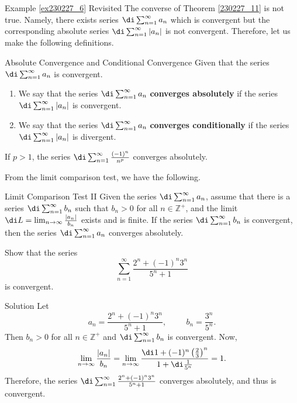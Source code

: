 \begin{example}{\linkt Example \ref{ex230227_6} Revisited}
The converse of Theorem \ref{230227_11} is not true. Namely, there exists series $\di\sum_{n=1}^{\infty}a_n$ which is  convergent but the corresponding absolute series $\di\sum_{n=1}^{\infty}|a_n|$ is not convergent. Therefore, let us make the following definitions.
\begin{definition}{Absolute Convergence and Conditional Convergence}
Given that the series $\di\sum_{n=1}^{\infty}a_n$ is convergent.
\begin{enumerate}[1.]
\item
We say that the series $\di\sum_{n=1}^{\infty}a_n$ {\bf converges absolutely} if the series $\di\sum_{n=1}^{\infty}|a_n|$ is convergent.
\item We say that the series $\di\sum_{n=1}^{\infty}a_n$ {\bf converges conditionally} if the series $\di\sum_{n=1}^{\infty}|a_n|$ is divergent.
\end{enumerate}
\end{definition}

 

\begin{example}{}
If $p>1$, the series $\di\sum_{n=1}^{\infty}\frac{(-1)^n}{n^p}$ converges absolutely.
\end{example}

From the limit comparison test, we have the following. 
\begin{theorem}{Limit Comparison Test II}
Given the  series  $\di\sum_{n=1}^{\infty}a_n$, assume that there is a series $\di\sum_{n=1}^{\infty}b_n$ such that $b_n>0$ for all $n\in\mathbb{Z}^+$, and the limit $\di L=\lim_{n\to\infty} \frac{|a_n|}{b_n} $ exists and is finite. 
 If  the series $\di\sum_{n=1}^{\infty}b_n$ is convergent, then the  series $\di\sum_{n=1}^{\infty}a_n$ converges absolutely.
 
\end{theorem}

\begin{example}{}
Show that the series
\[\sum_{n=1}^{\infty} \frac{2^n+(-1)^n3^n}{5^n+1}\] is convergent.
\end{example}
\begin{solution}{Solution}
Let
\[a_n=\frac{2^n+(-1)^n3^n}{5^n+1},\hspace{1cm}b_n=\frac{3^n}{5^n}.\]
Then $b_n>0$ for all $n\in\mathbb{Z}^+$ and $\di\sum_{n=1}^{\infty}b_n$ is convergent. Now,
\[\lim_{n\to\infty}\frac{|a_n|}{b_n}=\lim_{n\to\infty}\frac{\di 1+(-1)^n\left(\frac{2}{3}\right)^n}{1+\di \frac{1}{5^n}}=1.\]
Therefore, the series $\di \sum_{n=1}^{\infty} \frac{2^n+(-1)^n3^n}{5^n+1}$ converges absolutely, and thus is convergent.
\end{solution}


\end{example}
